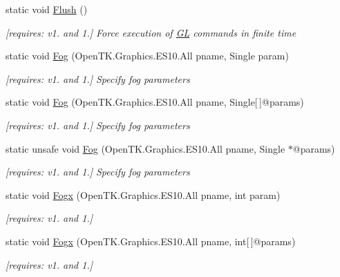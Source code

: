 \begin{DoxyCompactItemize}
static void \hyperlink{class_open_t_k_1_1_graphics_1_1_e_s10_1_1_g_l_a3ba85aeb0b60459ec3a976668921d720}{Flush} ()
\begin{DoxyCompactList}\small\item\em \mbox{[}requires\-: v1. and 1.\mbox{]} Force execution of \hyperlink{class_open_t_k_1_1_graphics_1_1_e_s10_1_1_g_l}{G\-L} commands in finite time \end{DoxyCompactList}\item 
static void \hyperlink{class_open_t_k_1_1_graphics_1_1_e_s10_1_1_g_l_ad582007d6bd5f4c3835041f6fee28269}{Fog} (Open\-T\-K.\-Graphics.\-E\-S10.\-All pname, Single param)
\begin{DoxyCompactList}\small\item\em \mbox{[}requires\-: v1. and 1.\mbox{]} Specify fog parameters \end{DoxyCompactList}\item 
static void \hyperlink{class_open_t_k_1_1_graphics_1_1_e_s10_1_1_g_l_aa4ad34189ec29c2654ae7b334144d5b2}{Fog} (Open\-T\-K.\-Graphics.\-E\-S10.\-All pname, Single\mbox{[}$\,$\mbox{]}@params)
\begin{DoxyCompactList}\small\item\em \mbox{[}requires\-: v1. and 1.\mbox{]} Specify fog parameters \end{DoxyCompactList}\item 
static unsafe void \hyperlink{class_open_t_k_1_1_graphics_1_1_e_s10_1_1_g_l_a373a9f40afcf59ab61ef62a7129e9bdb}{Fog} (Open\-T\-K.\-Graphics.\-E\-S10.\-All pname, Single $\ast$@params)
\begin{DoxyCompactList}\small\item\em \mbox{[}requires\-: v1. and 1.\mbox{]} Specify fog parameters \end{DoxyCompactList}\item 
static void \hyperlink{class_open_t_k_1_1_graphics_1_1_e_s10_1_1_g_l_a2bc91bc9047e98bee0e696e53d4362f8}{Fogx} (Open\-T\-K.\-Graphics.\-E\-S10.\-All pname, int param)
\begin{DoxyCompactList}\small\item\em \mbox{[}requires\-: v1. and 1.\mbox{]}\end{DoxyCompactList}\item 
static void \hyperlink{class_open_t_k_1_1_graphics_1_1_e_s10_1_1_g_l_a4636e7ddb1567d30816657fbd1797ae8}{Fogx} (Open\-T\-K.\-Graphics.\-E\-S10.\-All pname, int\mbox{[}$\,$\mbox{]}@params)
\begin{DoxyCompactList}\small\item\em \mbox{[}requires\-: v1. and 1.\mbox{]}\end{DoxyCompactList}\item 

\end{DoxyCompactItemize}

